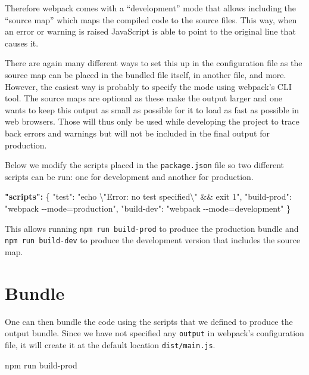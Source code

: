 \documentclass[
  10pt,
]{krantz}
\makeatletter
\newenvironment{Shaded}{\begin{snugshade}}{\end{snugshade}}
\newcommand{\CharTok}[1]{\textcolor[rgb]{0.5,0.5,0.5}{#1}}
\newcommand{\DataTypeTok}[1]{\textcolor[rgb]{0.27,0.27,0.27}{#1}}
\newcommand{\ErrorTok}[1]{\textcolor[rgb]{0.14,0.14,0.14}{\textbf{#1}}}
\newcommand{\ExtensionTok}[1]{#1}
\newcommand{\FunctionTok}[1]{\textcolor[rgb]{0,0,0}{#1}}
\newcommand{\NormalTok}[1]{#1}
\newcommand{\StringTok}[1]{\textcolor[rgb]{0.5,0.5,0.5}{#1}}
\newenvironment{kframe}{%
\medskip{}
\setlength{\fboxsep}{.8em}
 \def\at@end@of@kframe{}%
 \ifinner\ifhmode%
  \def\at@end@of@kframe{\end{minipage}}%
  \begin{minipage}{\columnwidth}%
 \fi\fi%
 \def\FrameCommand##1{\hskip\@totalleftmargin \hskip-\fboxsep
 \colorbox{shadecolor}{##1}\hskip-\fboxsep
     \hskip-\linewidth \hskip-\@totalleftmargin \hskip\columnwidth}%
 \MakeFramed {\advance\hsize-\width
   \@totalleftmargin\z@ \linewidth\hsize
   \@setminipage}}%
 {\par\unskip\endMakeFramed%
 \at@end@of@kframe}
\renewenvironment{Shaded}{\begin{kframe}}{\end{kframe}}
\makeatother
\begin{document}
Therefore webpack comes with a ``development'' mode that allows including the ``source map'' which maps the compiled code to the source files. This way, when an error or warning is raised JavaScript is able to point to the original line that causes it.

There are again many different ways to set this up in the configuration file as the source map can be placed in the bundled file itself, in another file, and more. However, the easiest way is probably to specify the mode using webpack's CLI tool. The source maps are optional as these make the output larger and one wants to keep this output as small as possible for it to load as fast as possible in web browsers. Those will thus only be used while developing the project to trace back errors and warnings but will not be included in the final output for production.

Below we modify the scripts placed in the \texttt{package.json} file so two different scripts can be run: one for development and another for production.

\begin{Shaded}
\begin{Highlighting}[]
\ErrorTok{"scripts":} \FunctionTok{\{}
  \DataTypeTok{"test"}\FunctionTok{:} \StringTok{"echo }\CharTok{\textbackslash{}"}\StringTok{Error: no test specified}\CharTok{\textbackslash{}"}\StringTok{ \&\& exit 1"}\FunctionTok{,}
  \DataTypeTok{"build{-}prod"}\FunctionTok{:} \StringTok{"webpack {-}{-}mode=production"}\FunctionTok{,}
  \DataTypeTok{"build{-}dev"}\FunctionTok{:} \StringTok{"webpack {-}{-}mode=development"}
\FunctionTok{\}}
\end{Highlighting}
\end{Shaded}

This allows running \texttt{npm\ run\ build-prod} to produce the production bundle and \texttt{npm\ run\ build-dev} to produce the development version that includes the source map.

\hypertarget{webpack-intro-bundle}{%
\section{Bundle}\label{webpack-intro-bundle}}

One can then bundle the code using the scripts that we defined to produce the output bundle. Since we have not specified any \texttt{output} in webpack's configuration file, it will create it at the default location \texttt{dist/main.js}.

\begin{Shaded}
\begin{Highlighting}[]
\ExtensionTok{npm}\NormalTok{ run build{-}prod}
\end{Highlighting}
\end{Shaded}
\end{document}
